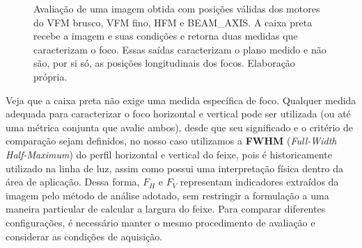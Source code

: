 \documentclass[12pt,a4paper]{article}
\begin{document}
\begin{figure}[htbp]
    \centering
    \caption{Avaliação de uma imagem obtida com posições válidas dos motores do VFM brusco, VFM fino, HFM e BEAM\_AXIS. A caixa preta recebe a imagem e suas condições e retorna duas medidas que caracterizam o foco. Essas saídas caracterizam o plano medido e não são, por si só, as posições longitudinais dos focos. Elaboração própria.}
    \label{fig:caixa-preta-foco}
\end{figure}

Veja que a caixa preta não exige uma medida específica de foco. Qualquer medida adequada para caracterizar o foco horizontal e vertical pode ser utilizada (ou até uma métrica conjunta que avalie ambos), desde que seu significado e o critério de comparação sejam definidos, no nosso caso utilizamos a \textbf{FWHM} (\textit{Full-Width Half-Maximum}) do perfil horizontal e vertical do feixe, pois é historicamente utilizado na linha de luz, assim como possui uma interpretação física dentro da área de aplicação. Dessa forma, $F_H$ e $F_V$ representam indicadores extraídos da imagem pelo método de análise adotado, sem restringir a formulação a uma maneira particular de calcular a largura do feixe. Para comparar diferentes configurações, é necessário manter o mesmo procedimento de avaliação e considerar as condições de aquisição.
\end{document}
